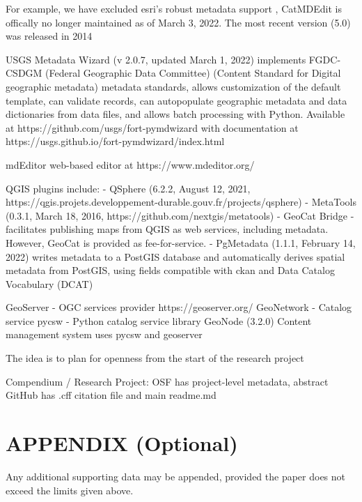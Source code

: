 \documentclass{isprs} %
\begin{document}
For example, we have excluded esri's robust metadata support , CatMDEdit is offically no longer maintained as of March 3, 2022. The most recent version (5.0) was released in 2014



USGS Metadata Wizard (v 2.0.7, updated March 1, 2022) implements FGDC-CSDGM (Federal Geographic Data Committee) (Content Standard for Digital geographic metadata) metadata standards, allows customization of the default template, can validate records, can autopopulate geographic metadata and data dictionaries from data files, and allows batch processing with Python. Available at https://github.com/usgs/fort-pymdwizard with documentation at https://usgs.github.io/fort-pymdwizard/index.html

mdEditor web-based editor at https://www.mdeditor.org/ 

QGIS plugins include:
- QSphere (6.2.2, August 12, 2021, https://qgis.projets.developpement-durable.gouv.fr/projects/qsphere)
- MetaTools (0.3.1, March 18, 2016, https://github.com/nextgis/metatools)
- GeoCat Bridge - facilitates publishing maps from QGIS as web services, including metadata. However, GeoCat is provided as fee-for-service.
- PgMetadata (1.1.1, February 14, 2022) writes metadata to a PostGIS database and automatically derives spatial metadata from PostGIS, using fields compatible with ckan and Data Catalog Vocabulary (DCAT)

GeoServer - OGC services provider https://geoserver.org/ 
GeoNetwork - Catalog service
pycsw - Python catalog service library
GeoNode (3.2.0) Content management system uses pycsw and geoserver



The idea is to plan for openness from the start of the research project

Compendium / Research Project:
OSF has project-level metadata, abstract
GitHub has .cff citation file and main readme.md







\section*{APPENDIX (Optional)}\label{APPENDIX}

Any additional supporting data may be appended, provided the paper does not exceed the limits given above. 
\end{document}
